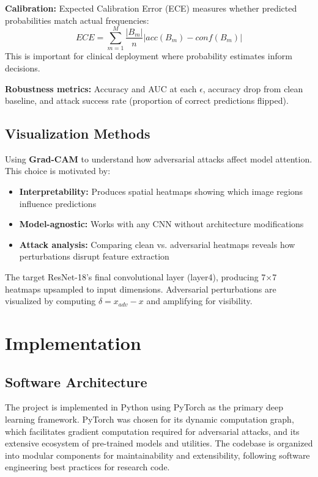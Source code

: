 \documentclass[12pt,a4paper]{article}
\begin{document}
\textbf{Calibration:} Expected Calibration Error (ECE) measures whether predicted probabilities match actual frequencies:
\begin{equation}
    ECE = \sum_{m=1}^{M} \frac{|B_m|}{n} |acc(B_m) - conf(B_m)|
\end{equation}
This is important for clinical deployment where probability estimates inform decisions.

\textbf{Robustness metrics:} Accuracy and AUC at each $\epsilon$, accuracy drop from clean baseline, and attack success rate (proportion of correct predictions flipped).

\subsection{Visualization Methods}

Using \textbf{Grad-CAM} \cite{selvaraju2017} to understand how adversarial attacks affect model attention. This choice is motivated by:
\begin{itemize}[leftmargin=*]
    \item \textbf{Interpretability:} Produces spatial heatmaps showing which image regions influence predictions
    \item \textbf{Model-agnostic:} Works with any CNN without architecture modifications
    \item \textbf{Attack analysis:} Comparing clean vs. adversarial heatmaps reveals how perturbations disrupt feature extraction
\end{itemize}

The target ResNet-18's final convolutional layer (layer4), producing 7$\times$7 heatmaps upsampled to input dimensions. Adversarial perturbations are visualized by computing $\delta = x_{adv} - x$ and amplifying for visibility.

\section{Implementation}
\label{sec:implementation}

\subsection{Software Architecture}

The project is implemented in Python using PyTorch as the primary deep learning framework. PyTorch was chosen for its dynamic computation graph, which facilitates gradient computation required for adversarial attacks, and its extensive ecosystem of pre-trained models and utilities. The codebase is organized into modular components for maintainability and extensibility, following software engineering best practices for research code.
\end{document}
